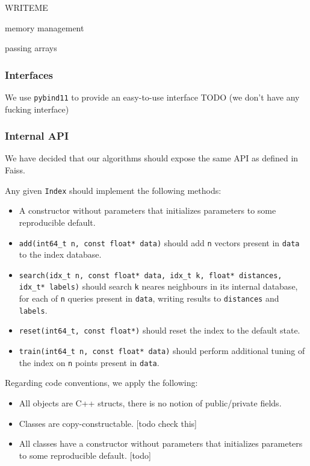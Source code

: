         WRITEME

        memory management
        
        passing arrays
    
    \subsubsection{Interfaces}
    
        We use \texttt{pybind11} to provide an easy-to-use interface
        TODO (we don't have any fucking interface)
        
    \subsubsection{Internal API}

        We have decided that our algorithms should expose the same API as defined in Faiss.
        
        Any given \texttt{Index} should implement the following methods:
        \begin{itemize}
            
            \item A constructor without parameters that initializes parameters to some reproducible default.
            
            \item \texttt{add(int64\_t n, const float* data)} 
                should add \texttt{n} vectors present in \texttt{data} to the index database.
            
            \item \texttt{search(idx\_t n, const float* data, idx\_t k, float* distances, idx\_t* labels)} 
                should search \texttt{k} neares neighbours 
                in its internal database, for each of \texttt{n} queries present in \texttt{data}, writing results to \texttt{distances} and \texttt{labels}.
            
            \item \texttt{reset(int64\_t, const float*)} 
                should reset the index to the default state.
            
            \item \texttt{train(int64\_t n, const float* data)} 
                should perform additional tuning of the index on \texttt{n} points present in \texttt{data}.

        \end{itemize}
        
        Regarding code conventions, we apply the following:
        
        \begin{itemize}
            \item All objects are C++ structs, there is no notion of public/private fields.
            \item Classes are copy-constructable. [todo check this]
            \item All classes have a constructor without parameters that initializes parameters to some reproducible default. [todo]
        \end{itemize}

